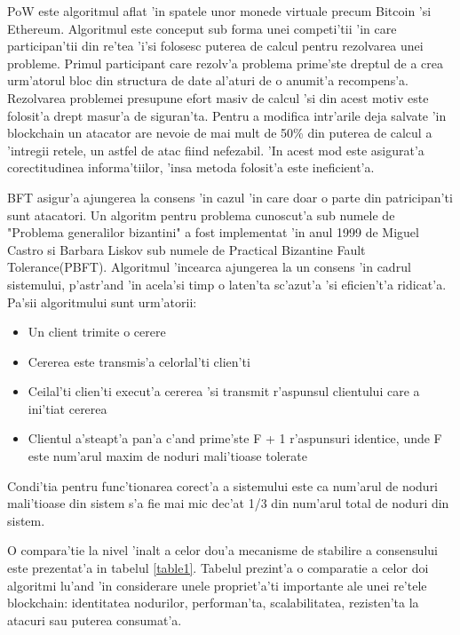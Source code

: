 \documentclass[12pt,a4paper,twoside]{report}
\begin{document}
		PoW este algoritmul aflat 'in spatele unor monede virtuale precum Bitcoin 'si Ethereum. Algoritmul este conceput sub forma unei competi'tii 'in care participan'tii din re'tea 'i'si folosesc puterea de calcul pentru rezolvarea unei probleme\cite{pow}. Primul participant care rezolv'a problema prime'ste dreptul de a crea urm'atorul bloc din structura de date al'aturi de o anumit'a recompens'a. Rezolvarea problemei presupune efort masiv de calcul\cite{energy-bit} 'si din acest motiv este folosit'a drept masur'a de siguran'ta. Pentru a modifica intr'arile deja salvate 'in blockchain un atacator are nevoie de mai mult de 50\% din puterea de calcul a 'intregii retele, un astfel de atac fiind nefezabil. 'In acest mod este asigurat'a corectitudinea informa'tiilor, 'insa metoda folosit'a este ineficient'a.
		
		BFT asigur'a ajungerea la consens 'in cazul 'in care doar o parte din patricipan'ti sunt atacatori. Un algoritm pentru problema  cunoscut'a sub numele de "Problema generalilor bizantini"\cite{generals} a fost implementat 'in anul 1999 de Miguel Castro si Barbara Liskov sub numele de Practical Bizantine Fault Tolerance(PBFT)\cite{pbft}. Algoritmul 'incearca ajungerea la un consens 'in cadrul sistemului, p'astr'and 'in acela'si timp o laten'ta sc'azut'a 'si eficien't'a ridicat'a. Pa'sii algoritmului sunt urm'atorii:
		\begin{itemize}
			\item Un client trimite o cerere 
			\item Cererea este transmis'a celorlal'ti clien'ti
			\item Ceilal'ti clien'ti execut'a cererea 'si transmit r'aspunsul clientului care a ini'tiat cererea
			\item Clientul a'steapt'a pan'a c'and prime'ste F + 1 r'aspunsuri identice, unde F este num'arul maxim de noduri mali'tioase tolerate
			
		\end{itemize}
		Condi'tia pentru func'tionarea corect'a a sistemului este ca num'arul de noduri mali'tioase din sistem s'a fie mai mic dec'at 1/3 din num'arul total de noduri din sistem.
		
		O compara'tie la nivel 'inalt a celor dou'a mecanisme de stabilire a consensului este prezentat'a in tabelul \ref{table1}. Tabelul prezint'a o comparatie a celor doi algoritmi lu'and 'in considerare unele propriet'a'ti importante ale unei re'tele blockchain: identitatea nodurilor, performan'ta, scalabilitatea, rezisten'ta la atacuri sau puterea consumat'a.
		
\end{document}
